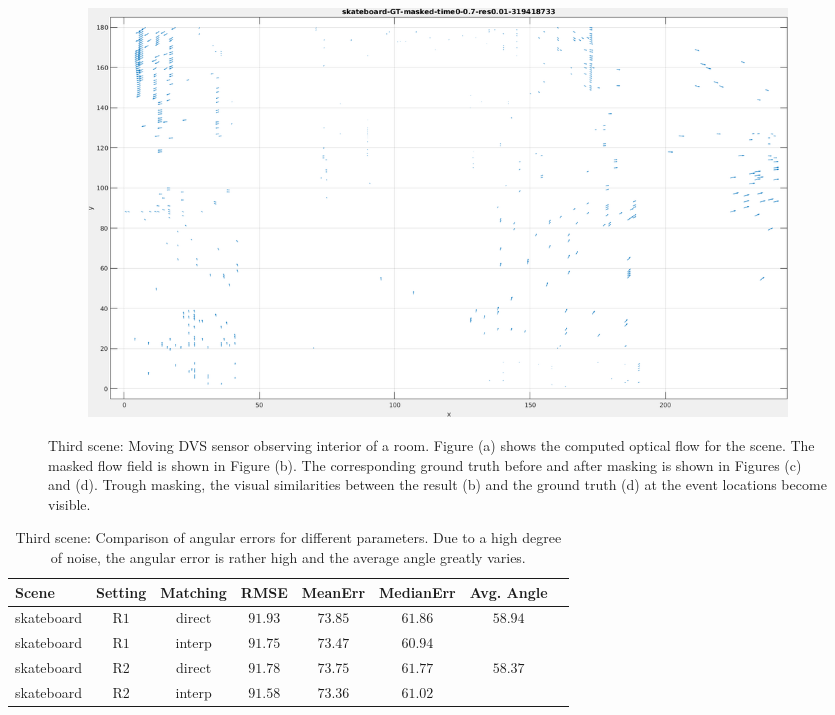 \begin{figure}[tb]
\begin{subfigure}{.45\textwidth}
  \caption{}
\end{subfigure}
\begin{subfigure}{.45\textwidth}
  \centering
  \includegraphics[height=.6\linewidth]{figs/skateboard/skateboard-GT-masked-1.png}
  \caption{}
\end{subfigure}
\caption[Third scene: Moving DVS sensor observing interior of a room.]{Third scene: Moving DVS sensor observing interior of a room. 
Figure (a) shows the computed optical flow for the scene. 
The masked flow field is shown in Figure (b).
The corresponding ground truth before and after masking is shown in Figures (c) and (d). 
Trough masking, the visual similarities between the result (b) and the ground truth (d) at the event locations become visible.
}
\label{fig:skateboard-snapshots}
\end{figure}

\begin{table}[tb]
	\centering
		\begin{tabular}{lccccccc}
Scene & Setting & Matching & RMSE & MeanErr & MedianErr & Avg. Angle \\
\hline  \hline
skateboard & R$1$ & direct & $91.93$ & $73.85$ & $61.86$ & $58.94$ & \\
skateboard & R$1$ & interp & $91.75$ & $73.47$ & $60.94$ &  & \\
skateboard & R$2$ & direct & $91.78$ & $73.75$ & $61.77$ & $58.37$ & \\
skateboard & R$2$ & interp & $91.58$ & $73.36$ & $61.02$ &  & \\
		\end{tabular}
	\caption[Third scene: Comparison of angular errors for different parameters.]{Third scene: Comparison of angular errors for different parameters. 
	Due to a high degree of noise, the angular error is rather high and the average angle greatly varies.}
	\label{tab:error_comparison_skateboard}
\end{table}

